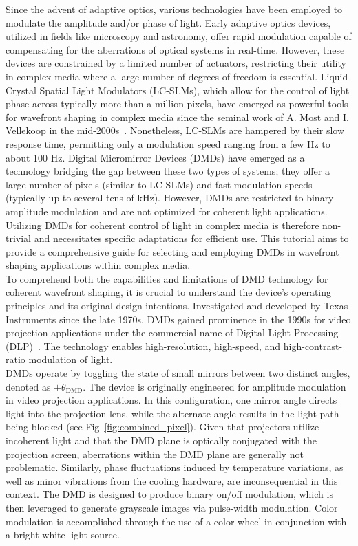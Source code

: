 \documentclass[12pt]{iopart}
\begin{document}
Since the advent of adaptive optics, various technologies have been employed 
to modulate the amplitude and/or phase of light. 
Early adaptive optics devices, utilized in fields like microscopy and astronomy, 
offer rapid modulation capable of compensating for the aberrations of optical systems 
in real-time. 
However, these devices are constrained by a limited number of actuators, 
restricting their utility in complex media where a large number of degrees of freedom is essential. 
Liquid Crystal Spatial Light Modulators (LC-SLMs), 
which allow for the control of light phase across typically more than a million pixels, 
have emerged as powerful tools for wavefront shaping in complex media 
since the seminal work of A. Most and I. Vellekoop in the mid-2000s~\cite{Vellekoop2007focusing}. 
Nonetheless, LC-SLMs are hampered by their slow response time, 
permitting only a modulation speed ranging from a few Hz to about 100 Hz. 
Digital Micromirror Devices (DMDs) have emerged as a technology bridging the gap 
between these two types of systems; 
they offer a large number of pixels (similar to LC-SLMs) and fast modulation speeds (typically up to several tens of kHz). 
However, DMDs are restricted to binary amplitude modulation and are not optimized for coherent light applications. 
Utilizing DMDs for coherent control of light in complex media is therefore non-trivial 
and necessitates specific adaptations for efficient use. 
This tutorial aims to provide a comprehensive guide 
for selecting and employing DMDs in wavefront shaping applications within complex media.\\



To comprehend both the capabilities and limitations
of DMD technology for coherent wavefront shaping,
it is crucial to understand the device's operating principles
and its original design intentions.
Investigated and developed by Texas Instruments since the late 1970s,
DMDs gained prominence in the 1990s for video projection applications
under the commercial name of Digital Light Processing (DLP)~\cite{Dudley2003emerging}.
The technology enables high-resolution, high-speed, and high-contrast-ratio modulation of light.\\
DMDs operate by toggling the state of small mirrors between two distinct angles, denoted as $\pm \theta_\text{DMD}$.
The device is originally engineered for amplitude modulation in video projection applications.
In this configuration, one mirror angle directs light into the projection lens,
while the alternate angle results in the light path being blocked (see Fig~\ref{fig:combined_pixel}).
Given that projectors utilize incoherent light and that the DMD plane is optically conjugated with the projection screen,
aberrations within the DMD plane are generally not problematic.
Similarly, phase fluctuations induced by temperature variations, 
as well as minor vibrations from the cooling hardware, are inconsequential in this context.
The DMD is designed to produce binary on/off modulation,
which is then leveraged to generate grayscale images via pulse-width modulation.
Color modulation is accomplished through the use of a color wheel in conjunction with a bright white light source.\\
\end{document}
